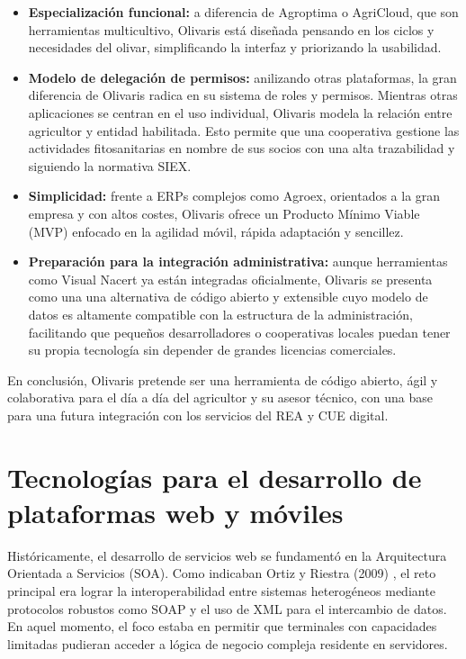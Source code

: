 \begin{itemize}
    \item \textbf{Especialización funcional:} a diferencia de Agroptima o AgriCloud, que son herramientas multicultivo, Olivaris está diseñada pensando 
    en los ciclos y necesidades del olivar, simplificando la interfaz y priorizando la usabilidad.

    \item \textbf{Modelo de delegación de permisos:} anilizando otras plataformas, la gran diferencia de Olivaris radica en su sistema de roles y permisos. 
    Mientras otras aplicaciones se centran en el uso individual, Olivaris modela la relación entre agricultor y entidad habilitada. Esto permite que una 
    cooperativa gestione las actividades fitosanitarias en nombre de sus socios con una alta trazabilidad y siguiendo la normativa SIEX.

    \item \textbf{Simplicidad:} frente a ERPs complejos como Agroex, orientados a la gran empresa y con altos costes, Olivaris ofrece un Producto Mínimo Viable (MVP) 
    enfocado en la agilidad móvil, rápida adaptación y sencillez.

    \item \textbf{Preparación para la integración administrativa:} aunque herramientas como Visual Nacert ya están integradas oficialmente, Olivaris se presenta como una
    una alternativa de código abierto y extensible cuyo modelo de datos es altamente compatible con la estructura de la administración, facilitando que pequeños 
    desarrolladores o cooperativas locales puedan tener su propia tecnología sin depender de grandes licencias comerciales.
\end{itemize}

En conclusión, Olivaris pretende ser una herramienta de código abierto, ágil y colaborativa para el día a día del agricultor y su asesor técnico, con una base para 
una futura integración con los servicios del REA y CUE digital.

\section{Tecnologías para el desarrollo de plataformas web y móviles}

Históricamente, el desarrollo de servicios web se fundamentó en la Arquitectura Orientada a Servicios (SOA). Como 
indicaban Ortiz y Riestra (2009) \cite{evolucionDinamicaSistemasSoftware}, el reto principal era lograr la 
interoperabilidad entre sistemas heterogéneos mediante protocolos robustos como SOAP y el uso de XML para el 
intercambio de datos. En aquel momento, el foco estaba en permitir que terminales con capacidades limitadas pudieran
acceder a lógica de negocio compleja residente en servidores.

